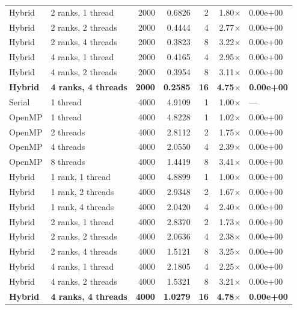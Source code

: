 \documentclass[11pt,a4paper]{article}
\begin{document}
\begin{longtable}{llrrrrl}
Hybrid & 2 ranks, 1 thread & 2000 & 0.6826 & 2  & 1.80$\times$ & 0.00e+00 \\
Hybrid & 2 ranks, 2 threads& 2000 & 0.4444 & 4  & 2.77$\times$ & 0.00e+00 \\
Hybrid & 2 ranks, 4 threads& 2000 & 0.3823 & 8  & 3.22$\times$ & 0.00e+00 \\
Hybrid & 4 ranks, 1 thread & 2000 & 0.4165 & 4  & 2.95$\times$ & 0.00e+00 \\
Hybrid & 4 ranks, 2 threads& 2000 & 0.3954 & 8  & 3.11$\times$ & 0.00e+00 \\
\textbf{Hybrid} & \textbf{4 ranks, 4 threads}& \textbf{2000} & \textbf{0.2585}
       & \textbf{16} & \textbf{4.75}$\boldsymbol{\times}$ & \textbf{0.00e+00} \\
\midrule
Serial & 1 thread          & 4000 & 4.9109 & 1  & 1.00$\times$ & --- \\
OpenMP & 1 thread          & 4000 & 4.8228 & 1  & 1.02$\times$ & 0.00e+00 \\
OpenMP & 2 threads         & 4000 & 2.8112 & 2  & 1.75$\times$ & 0.00e+00 \\
OpenMP & 4 threads         & 4000 & 2.0550 & 4  & 2.39$\times$ & 0.00e+00 \\
OpenMP & 8 threads         & 4000 & 1.4419 & 8  & 3.41$\times$ & 0.00e+00 \\
Hybrid & 1 rank, 1 thread  & 4000 & 4.8899 & 1  & 1.00$\times$ & 0.00e+00 \\
Hybrid & 1 rank, 2 threads & 4000 & 2.9348 & 2  & 1.67$\times$ & 0.00e+00 \\
Hybrid & 1 rank, 4 threads & 4000 & 2.0420 & 4  & 2.40$\times$ & 0.00e+00 \\
Hybrid & 2 ranks, 1 thread & 4000 & 2.8370 & 2  & 1.73$\times$ & 0.00e+00 \\
Hybrid & 2 ranks, 2 threads& 4000 & 2.0636 & 4  & 2.38$\times$ & 0.00e+00 \\
Hybrid & 2 ranks, 4 threads& 4000 & 1.5121 & 8  & 3.25$\times$ & 0.00e+00 \\
Hybrid & 4 ranks, 1 thread & 4000 & 2.1805 & 4  & 2.25$\times$ & 0.00e+00 \\
Hybrid & 4 ranks, 2 threads& 4000 & 1.5321 & 8  & 3.21$\times$ & 0.00e+00 \\
\textbf{Hybrid} & \textbf{4 ranks, 4 threads}& \textbf{4000} & \textbf{1.0279}
       & \textbf{16} & \textbf{4.78}$\boldsymbol{\times}$ & \textbf{0.00e+00} \\
\end{longtable}
\end{document}

